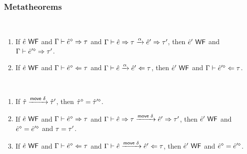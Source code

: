 \documentclass{article}
\begin{document}
%
\begin{mathpar}

\end{mathpar}

\subsubsection{Metatheorems}
\begin{theorem}[name=Sensibility] \
  \begin{enumerate}
    \item If $\zWellFormed{\ZMV}$ and $\ctxSynType{\ctx}{\cursorErase{\ZMV}}{\TMV}$ and
      $\ASEAction{\ctx}{\ZMV}{\TMV}{\ZMV'}{\TMV'}{\AMV}$, then $\zWellFormed{\ZMV'}$ and
      $\ctxSynType{\ctx}{\cursorErase{\ZMV'}}{\TMV'}$.

    \item If $\zWellFormed{\ZMV}$ and $\ctxAnaType{\ctx}{\cursorErase{\ZMV}}{\TMV}$ and
      $\AAEAction{\ctx}{\ZMV}{\ZMV'}{\TMV}{\AMV}$, then $\zWellFormed{\ZMV'}$ and
      $\ctxAnaType{\ctx}{\cursorErase{\ZMV'}}{\TMV}$.
  \end{enumerate}
\end{theorem}

\begin{theorem}[name=Movement Erasure Invariance] \
  \begin{enumerate}
    \item If $\AUTAction{\ZTMV}{\ZTMV'}{\AMove{\MMV}}$, then $\cursorErase{\ZTMV} =
      \cursorErase{\ZTMV'}$.

    \item If $\zWellFormed{\ZMV}$ and $\ctxSynType{\ctx}{\cursorErase{\ZMV}}{\TMV}$ and
      $\ASEAction{\ctx}{\ZMV}{\TMV}{\ZMV'}{\TMV'}{\AMove{\MMV}}$, then $\zWellFormed{\ZMV'}$ and
      $\cursorErase{\ZMV} = \cursorErase{\ZMV'}$ and $\equal{\TMV}{\TMV'}$.

    \item If $\zWellFormed{\ZMV}$ and $\ctxAnaType{\ctx}{\cursorErase{\ZMV}}{\TMV}$ and
      $\AAEAction{\ctx}{\ZMV}{\ZMV'}{\TMV}{\AMove{\MMV}}$, then $\zWellFormed{\ZMV'}$ and
      $\cursorErase{\ZMV} = \cursorErase{\ZMV'}$.
  \end{enumerate}
\end{theorem}
\end{document}
